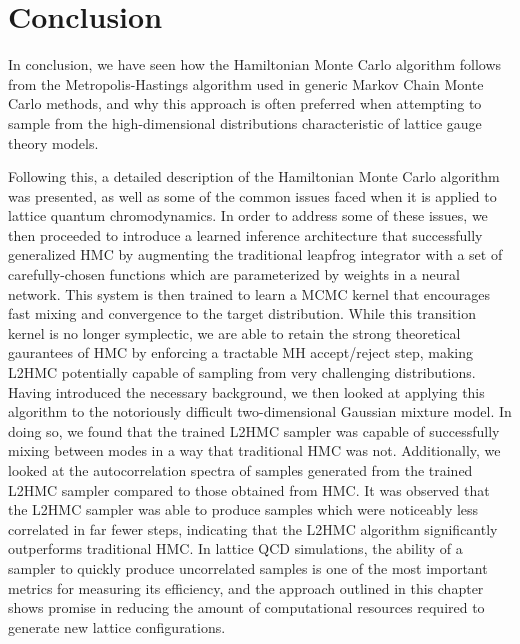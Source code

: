 \documentclass[../main.tex]{subfiles}
\begin{document}
\section{Conclusion}%
\label{sec:l2hmc_conclusion}
In conclusion, we have seen how the Hamiltonian Monte Carlo algorithm follows from the Metropolis-Hastings algorithm
used in generic Markov Chain Monte Carlo methods, and why this approach is often preferred when attempting to sample
from the high-dimensional distributions characteristic of lattice gauge theory models.

Following this, a detailed description of the Hamiltonian Monte Carlo algorithm was presented, as well as some of the
common issues faced when it is applied to lattice quantum chromodynamics.
%
In order to address some of these issues, we then proceeded to introduce a learned inference architecture that
successfully generalized HMC by augmenting the traditional leapfrog integrator with a set of carefully-chosen functions
which are parameterized by weights in a neural network.
%
This system is then trained to learn a MCMC kernel that encourages fast mixing and convergence to the target
distribution.
%
While this transition kernel is no longer symplectic, we are able to retain the strong theoretical gaurantees of HMC by
enforcing a tractable MH accept/reject step, making L2HMC potentially capable of sampling from very challenging
distributions.
%
Having introduced the necessary background, we then looked at applying this algorithm to the notoriously difficult
two-dimensional Gaussian mixture model.
%
In doing so, we found that the trained L2HMC sampler was capable of successfully mixing between modes in a way that
traditional HMC was not.
%
Additionally, we looked at the autocorrelation spectra of samples generated from the trained L2HMC sampler compared to
those obtained from HMC.
%
It was observed that the L2HMC sampler was able to produce samples which were noticeably less correlated in far
fewer steps, indicating that the L2HMC algorithm significantly outperforms traditional HMC.
%
In lattice QCD simulations, the ability of a sampler to quickly produce uncorrelated samples is one of the most
important metrics for measuring its efficiency, and the approach outlined in this chapter shows promise in reducing
the amount of computational resources required to generate new lattice configurations. 
\end{document}
